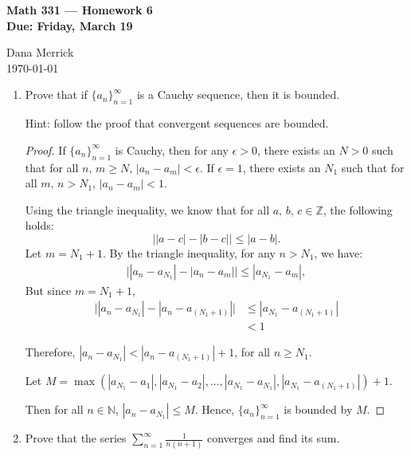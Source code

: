 \documentclass[12pt]{amsart}
\begin{document}
\thispagestyle{empty}

\begin{center}
{\bf Math 331  --- Homework 6 \\
Due:  Friday, March 19}
\end{center}

\bigskip

\noindent
Dana Merrick \\
\today

\bigskip


\begin{enumerate}

\setlength{\itemsep}{6pt}


\item Prove that if $\{a_n\}_{n=1}^\infty$ is a Cauchy
  sequence, then it is bounded.

Hint:  follow the proof that convergent sequences are bounded.

\begin{proof}
If $\{a_n\}_{n=1}^\infty$ is Cauchy, then for any $\epsilon >0$, there exists an $N>0$ such that for all $n,\,m \ge N$, $|a_n -a_m| < \epsilon$. If $\epsilon = 1$, there exists an $N_1$ such that for all $m,\,n > N_1$, $|a_n -a_m| < 1$.

Using the triangle inequality, we know that for all $a,\,b,\,c\in\mathbb Z$, the following holds:
\[ \big| |a - c| - |b-c| \big| \le |a - b|. \]
Let $m = N_1 + 1$. By the triangle inequality, for any $n>N_1$, we have:
\begin{align*}
\big| |a_n - a_{N_1} | - |a_n - a_m | \big| \le |a_{N_1} - a_m |,
\end{align*}
But since $m = N_1 + 1$,
\begin{align*}
\big| |a_n - a_{N_1} | - |a_n - a_{(N_1 + 1)} | \big| &\le |a_{N_1} - a_{(N_1+1)} | \\
&<1
\end{align*}


Therefore, $|a_n - a_{N_1}| < |a_n - a_{(N_1+1)}| + 1$, for all $n\ge N_1$.

Let $M=\max\left(|a_{N_1}-a_1|, |a_{N_1}-a_2|, \ldots, |a_{N_1}-a_{N_1}|, |a_{N_1}-a_{(N_1+1)}|\right) + 1$.

Then for all $n\in\mathbb N$, $|a_n - a_{N_1}| \le M$. Hence, $\{a_n\}_{n=1}^\infty$ is bounded by $M$.
\end{proof}

\item Prove that the series
%
$\displaystyle \sum_{n=1}^\infty \frac{1}{n(n+1)}$
%
converges and find its sum.


\end{enumerate}
\end{document}
